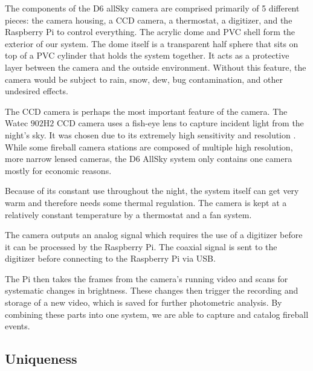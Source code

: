 The components of the D6 allSky camera are comprised primarily of 5 different pieces: the camera housing, a CCD camera, a thermostat, a digitizer, and the Raspberry Pi to control everything.
The acrylic dome and PVC shell form the exterior of our system. 
The dome itself is a transparent half sphere that sits on top of a PVC cylinder that holds the system together.
It acts as a protective layer between the camera and the outside environment.  
Without this feature, the camera would be subject to rain, snow, dew, bug contamination, and other undesired effects.

The CCD camera is perhaps the most important feature of the camera.  
The Watec $902$H$2$ CCD camera uses a fish-eye lens to capture incident light from the night's sky.
It was chosen due to its extremely high sensitivity and resolution \cite{mcswain_using_2016}.
While some fireball camera stations are composed of multiple high resolution, more narrow lensed cameras, the D6 AllSky system only contains one camera mostly for economic reasons.

Because of its constant use throughout the night, the system itself can get very warm and therefore needs some thermal regulation.
The camera is kept at a relatively constant temperature by a thermostat and a fan system. 

The camera outputs an analog signal which requires the use of a digitizer before it can be processed by the Raspberry Pi.
The coaxial signal is sent to the digitizer before connecting to the Raspberry Pi via USB.

The Pi then takes the frames from the camera's running video and scans for systematic changes in brightness.
These changes then trigger the recording and storage of a new video, which is saved for further photometric analysis.
By combining these parts into one system, we are able to capture and catalog fireball events.

\subsection{Uniqueness}

